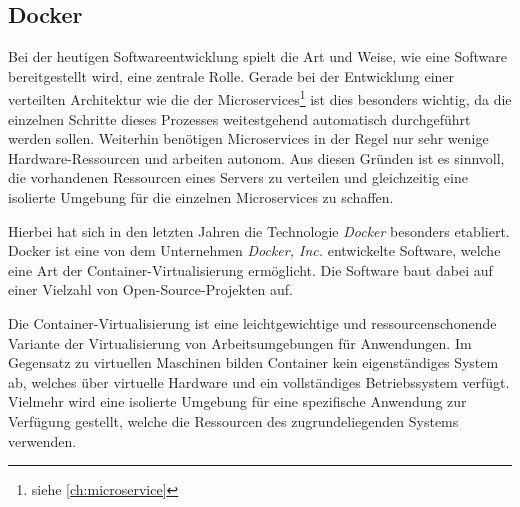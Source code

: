 \subsection{Docker}
\label{sec:grundlagen:docker}
Bei der heutigen Softwareentwicklung spielt die Art und Weise, wie eine Software bereitgestellt wird, eine zentrale Rolle.
Gerade bei der Entwicklung einer verteilten Architektur wie die der Microservices\footnote{siehe \ref{ch:microservice}} ist dies besonders wichtig, da die einzelnen Schritte dieses Prozesses weitestgehend automatisch durchgeführt werden sollen.
Weiterhin benötigen Microservices in der Regel nur sehr wenige Hardware-Ressourcen und arbeiten autonom.
Aus diesen Gründen ist es sinnvoll, die vorhandenen Ressourcen eines Servers zu verteilen und gleichzeitig eine isolierte Umgebung für die einzelnen Microservices zu schaffen.

Hierbei hat sich in den letzten Jahren die Technologie \emph{Docker} besonders etabliert.
Docker ist eine von dem Unternehmen \emph{Docker, Inc.} entwickelte Software, welche eine Art der Container-Virtualisierung ermöglicht.
Die Software baut dabei auf einer Vielzahl von Open-Source-Projekten auf.

Die Container-Virtualisierung ist eine leichtgewichtige und ressourcenschonende Variante der Virtualisierung von Arbeitsumgebungen für Anwendungen.
Im Gegensatz zu virtuellen Maschinen bilden Container kein eigenständiges System ab, welches über virtuelle Hardware und ein vollständiges Betriebssystem verfügt.
Vielmehr wird eine isolierte Umgebung für eine spezifische Anwendung zur Verfügung gestellt, welche die Ressourcen des zugrundeliegenden Systems verwenden.

